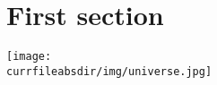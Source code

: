 \documentclass[12pt]{article}
\begin{document}
\section{First section}

\blindtext[1]
\texttt{[image: \\currfileabsdir/img/universe.jpg]}
\blindtext[1]

\vspace{8mm}

\blindtext[1]

% 
% 


\blindtext[1]



\end{document}
